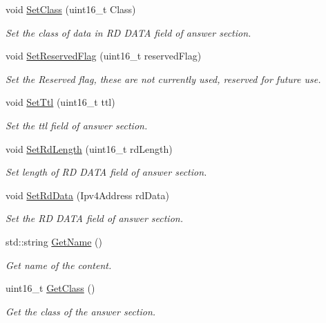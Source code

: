 \begin{DoxyCompactItemize}
void \hyperlink{classns3_1_1DnsPlusAnswerSection_ab1e5926e561e8728860024e0dd28a621}{Set\-Class} (uint16\-\_\-t Class)
\begin{DoxyCompactList}\small\item\em Set the class of data in R\-D D\-A\-T\-A field of answer section. \end{DoxyCompactList}\item 
void \hyperlink{classns3_1_1DnsPlusAnswerSection_a43fe4e27216871cb41e2aabd6ea41729}{Set\-Reserved\-Flag} (uint16\-\_\-t reserved\-Flag)
\begin{DoxyCompactList}\small\item\em Set the Reserved flag, these are not currently used, reserved for future use. \end{DoxyCompactList}\item 
void \hyperlink{classns3_1_1DnsPlusAnswerSection_a0eb309d8e58aac31bffa90518458de3b}{Set\-Ttl} (uint16\-\_\-t ttl)
\begin{DoxyCompactList}\small\item\em Set the ttl field of answer section. \end{DoxyCompactList}\item 
void \hyperlink{classns3_1_1DnsPlusAnswerSection_af7c04ba7137a994822eea5c9a2870ba1}{Set\-Rd\-Length} (uint16\-\_\-t rd\-Length)
\begin{DoxyCompactList}\small\item\em Set length of R\-D D\-A\-T\-A field of answer section. \end{DoxyCompactList}\item 
void \hyperlink{classns3_1_1DnsPlusAnswerSection_a9d577220126adbf68a0f6475b57560fb}{Set\-Rd\-Data} (Ipv4\-Address rd\-Data)
\begin{DoxyCompactList}\small\item\em Set the R\-D D\-A\-T\-A field of answer section. \end{DoxyCompactList}\item 
std\-::string \hyperlink{classns3_1_1DnsPlusAnswerSection_afdc38626ee1ff71c315bc2b6f119b350}{Get\-Name} ()
\begin{DoxyCompactList}\small\item\em Get name of the content. \end{DoxyCompactList}\item 
uint16\-\_\-t \hyperlink{classns3_1_1DnsPlusAnswerSection_ab1c3734345015e5178a41defed12e18e}{Get\-Class} ()
\begin{DoxyCompactList}\small\item\em Get the class of the answer section. \end{DoxyCompactList}\item 

\end{DoxyCompactItemize}
